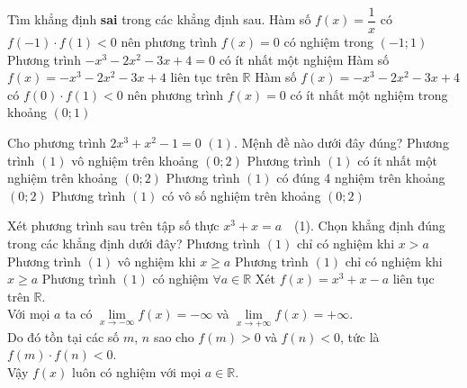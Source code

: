 \begin{ex}%
    Tìm khẳng định \textbf{sai} trong các khẳng định sau.
    \choice
    {\True Hàm số $f(x)=\dfrac{1}{x}$ có $f(-1)\cdot f(1)<0$ nên phương trình $f(x)=0$ có nghiệm trong $(-1;1)$}
    {Phương trình $-x^3-2x^2-3x+4=0$ có ít nhất một nghiệm}
    {Hàm số $f(x)=-x^3-2x^2-3x+4$ liên tục trên $\mathbb{R}$}
    {Hàm số $f(x)=-x^3-2x^2-3x+4$ có $f(0)\cdot f(1)<0$ nên phương trình $f(x)=0$ có ít nhất một nghiệm trong khoảng $(0;1)$}
\end{ex}
\begin{ex}%
Cho phương trình $2x^3+x^2-1=0$ $(1)$. Mệnh đề nào dưới đây đúng?
\choice
{Phương trình $(1)$ vô nghiệm trên khoảng $(0 ; 2)$}
{\True Phương trình $(1)$ có ít nhất một nghiệm trên khoảng $(0 ; 2)$}
{Phương trình $(1)$ có đúng 4 nghiệm trên khoảng $(0 ; 2)$}
{Phương trình $(1)$ có vô số nghiệm trên khoảng $(0 ; 2)$}
\end{ex}

\begin{ex}%
	Xét phương trình sau trên tập số thực $x^3+x=a \quad$(1). Chọn khẳng định đúng trong các khẳng định dưới đây?
	\choice
	{Phương trình $(1)$ chỉ có nghiệm khi $x>a$}
	{Phương trình $(1)$ vô nghiệm khi $x \geq a$}
	{Phương trình $(1)$ chỉ có nghiệm khi $x \geq a$}
	{\True Phương trình $(1)$ có nghiệm $\forall a \in \mathbb{R}$}
	\loigiai
	{
		Xét $f(x)=x^3+x-a$ liên tục trên $\mathbb{R}$.\\
		Với mọi $a$ ta có $\lim \limits_{x \to -\infty} f(x)=-\infty$ và $\lim \limits_{x \to +\infty} f(x)=+\infty$.\\
		Do đó tồn tại các số $m$, $n$ sao cho $f(m)>0$ và $f(n)<0$, tức là $f(m)\cdot f(n)<0$.\\
		Vậy $f(x)$ luôn có nghiệm với mọi $a\in\mathbb{R}$.
	}
\end{ex}

